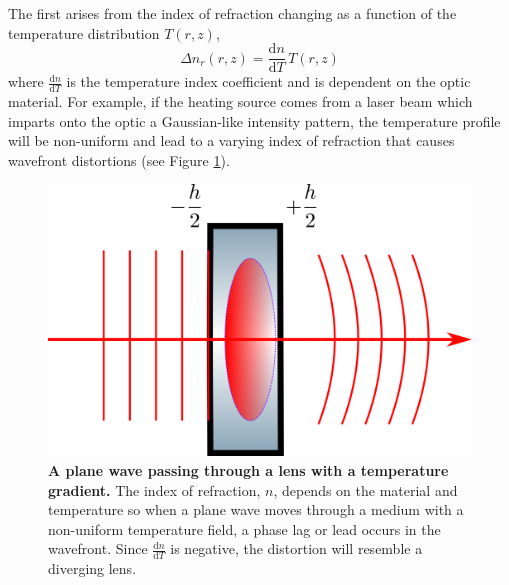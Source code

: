 	The first arises from the index of refraction changing as a function of the temperature distribution $T(r,z)$,
	\begin{equation}
	\Delta n_{r}(r,z) = \frac{\text{d}n}{\text{d}T} \, T(r,z)
	\end{equation}
	where $\frac{\text{d}n}{\text{d}T}$ is the temperature index coefficient and is dependent on the optic material.  For example, if the heating source comes from a laser beam which imparts onto the optic a Gaussian-like intensity pattern, the temperature profile will be non-uniform and lead to a varying index of refraction that causes wavefront distortions (see Figure \ref{fig:ThermalLensWF}).
	
	\begin{figure}[ht!]
		\centering
		\includegraphics[width=.4 \textwidth]{../Figures/ThermalLensWF.png}
		\caption[A plane wave passing through a lens with a temperature gradient.]  
		{\textbf{A plane wave passing through a lens with a temperature gradient.} The index of refraction, $n$, depends on the material and temperature so when a plane wave moves through a medium with a non-uniform temperature field, a phase lag or lead occurs in the wavefront. Since $\frac{\text{d}n}{\text{d}T}$ is negative, the distortion will resemble a diverging lens.}
		\label{fig:ThermalLensWF}
	\end{figure}

